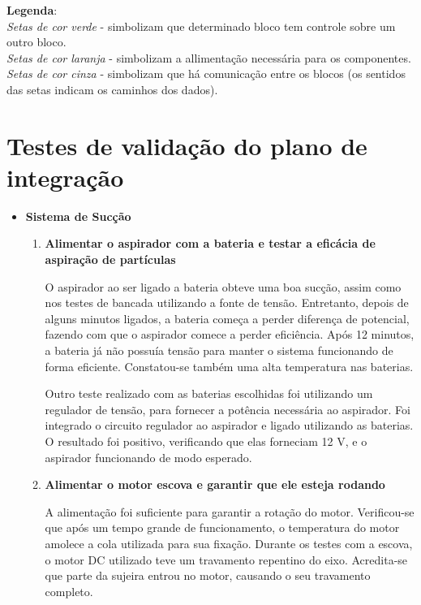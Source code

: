    	\noindent \textbf{Legenda}: \\
   	\noindent \textit{Setas de cor verde} - simbolizam que determinado bloco tem controle sobre um outro bloco. \\
   	\noindent \textit{Setas de cor laranja} - simbolizam a allimentação necessária para os componentes. \\
   	\noindent \textit{Setas de cor cinza} - simbolizam que há comunicação entre os blocos (os sentidos das setas indicam os caminhos dos dados).

\section{Testes de validação do plano de integração}
\label{sub:validação_plano_integração}
   \begin{itemize}
   		\item \textbf{Sistema de Sucção}

   			\begin{enumerate}
		      \item \textbf{Alimentar o aspirador com a bateria e testar a eficácia de aspiração de partículas}

		         O aspirador ao ser ligado a bateria obteve uma boa sucção, assim como nos testes de bancada utilizando a fonte de tensão. Entretanto, depois de alguns minutos ligados, a bateria começa a perder diferença de potencial, fazendo com que o aspirador comece a perder eficiência. Após 12 minutos, a bateria já não possuía tensão para manter o sistema funcionando de forma eficiente. Constatou-se também uma alta temperatura nas baterias. 

		         Outro teste realizado com as baterias escolhidas foi utilizando um regulador de tensão, para fornecer a potência necessária ao aspirador. Foi integrado o circuito regulador ao aspirador e ligado utilizando as baterias. O resultado foi positivo, verificando que elas forneciam 12 V, e o aspirador funcionando de modo esperado.

		      \item \textbf{Alimentar o motor escova e garantir que ele esteja rodando}

		         A alimentação foi suficiente para garantir a rotação do motor. Verificou-se que após um tempo grande de funcionamento, o temperatura do motor amolece a cola utilizada para sua fixação. Durante os testes com a escova, o motor DC utilizado teve um travamento repentino do eixo. Acredita-se que parte da sujeira entrou no motor, causando o seu travamento completo. 


\end{enumerate}
\end{itemize}
